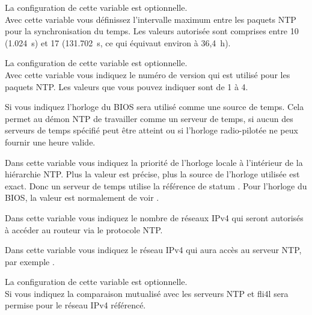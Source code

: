 \begin{description}

  La configuration de cette variable est optionnelle.\\
  Avec cette variable vous définissez l'intervalle maximum entre les paquets NTP
  pour la synchronisation du temps. Les valeurs autorisée sont comprises entre
  10 (1.024~s) et 17 (131.702~s, ce qui équivaut environ à 36,4~h).


  La configuration de cette variable est optionnelle.\\
  Avec cette variable vous indiquez le numéro de version qui est utilisé pour
  les paquets NTP. Les valeurs que vous pouvez indiquer sont de 1 à 4.


  Si vous indiquez  l'horloge du BIOS sera utilisé comme une source de
  temps. Cela permet au démon NTP de travailler comme un serveur de temps, si aucun
  des serveurs de temps spécifié peut être atteint ou si l'horloge radio-pilotée
  ne peux fournir une heure valide.


  Dans cette variable vous indiquez la priorité de l'horloge locale à l'intérieur de
  la hiérarchie NTP. Plus la valeur est précise, plus la source de l'horloge utilisée
  est exact. Donc un serveur de temps utilise la référence de statum . Pour
  l'horloge du BIOS, la valeur est normalement de  voir .


  Dans cette variable vous indiquez le nombre de réseaux IPv4 qui seront autorisés à accéder
  au routeur via le protocole NTP.


  Dans cette variable vous indiquez le réseau IPv4 qui aura accès au serveur NTP,
  par exemple .


  La configuration de cette variable est optionnelle.\\
  Si vous indiquez  la comparaison mutualisé avec les serveurs NTP et fli4l sera
  permise pour le réseau IPv4 référencé.


\end{description}
